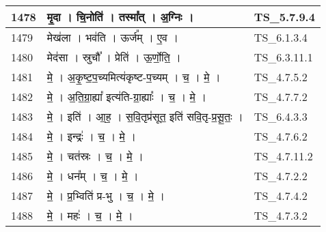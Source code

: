 \documentclass[17pt]{extarticle}
\begin{document}
\begin{longtable}{||p{0.4in}||p{4.9in}||p{0.9in}||}
    \hline
        
    1478 & मृ॒दा   ।   चि॒नोति॑   ।   तस्मा᳚त्   ।   अ॒ग्निः   ।    & TS\_5.7.9.4       \\
    
    \hline
        
    1479 & मेख॑ला   ।   भव॑ति   ।   ऊर्ज᳚म्   ।   ए॒व   ।    & TS\_6.1.3.4       \\
    
    \hline
        
    1480 & मेद॑सा   ।   स्रुचौ᳚   ।   प्रेति॑   ।   ऊ॒र्णो॒ति॒   ।    & TS\_6.3.11.1       \\
    
    \hline
        
    1481 & मे॒   ।   अ॒कृ॒ष्ट॒प॒च्यमित्य॑कृष्ट{-}प॒च्यम्   ।   च॒   ।   मे॒   ।    & TS\_4.7.5.2       \\
    
    \hline
        
    1482 & मे॒   ।   अ॒ति॒ग्रा॒ह्या᳚ इत्य॑ति{-}ग्रा॒ह्याः᳚   ।   च॒   ।   मे॒   ।    & TS\_4.7.7.2       \\
    
    \hline
        
    1483 & मे॒   ।   इति॑   ।   आ॒ह॒   ।   स॒वि॒तृप्र॑सूत॒ इति॑ सवि॒तृ{-}प्र॒सू॒तः॒   ।    & TS\_6.4.3.3       \\
    
    \hline
        
    1484 & मे॒   ।   इन्द्रः॑   ।   च॒   ।   मे॒   ।    & TS\_4.7.6.2       \\
    
    \hline
        
    1485 & मे॒   ।   चत॑स्रः   ।   च॒   ।   मे॒   ।    & TS\_4.7.11.2       \\
    
    \hline
        
    1486 & मे॒   ।   धन᳚म्   ।   च॒   ।   मे॒   ।    & TS\_4.7.2.2       \\
    
    \hline
        
    1487 & मे॒   ।   प्र॒भ्विति॑ प्र{-}भु   ।   च॒   ।   मे॒   ।    & TS\_4.7.4.2       \\
    
    \hline
        
    1488 & मे॒   ।   महः॑   ।   च॒   ।   मे॒   ।    & TS\_4.7.3.2       \\
    
    \hline
        

\end{longtable}
\end{document}
